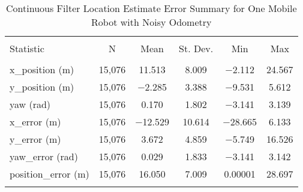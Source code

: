 
\begin{table}[htbp] \centering 
  \caption{Continuous Filter Location Estimate Error Summary for One Mobile Robot with Noisy Odometry} 
  \label{tab:one_mobile_continuous_summary} 
\begin{tabular}{@{\extracolsep{5pt}}lccccc} 
\\[-1.8ex]\hline 
\hline \\[-1.8ex] 
Statistic & \multicolumn{1}{c}{N} & \multicolumn{1}{c}{Mean} & \multicolumn{1}{c}{St. Dev.} & \multicolumn{1}{c}{Min} & \multicolumn{1}{c}{Max} \\ 
\hline \\[-1.8ex] 
x\_position (m) & 15,076 & \num{11.513} & \num{8.009} & $-$2.112 & \num{24.567} \\ 
y\_position (m) & 15,076 & $-$2.285 & \num{3.388} & $-$9.531 & \num{5.612} \\ 
yaw (rad) & 15,076 & \num{0.170} & \num{1.802} & $-$3.141 & \num{3.139} \\ 
x\_error (m) & 15,076 & $-$12.529 & \num{10.614} & $-$28.665 & \num{6.133} \\ 
y\_error (m) & 15,076 & \num{3.672} & \num{4.859} & $-$5.749 & \num{16.526} \\ 
yaw\_error (rad) & 15,076 & \num{0.029} & \num{1.833} & $-$3.141 & \num{3.142} \\ 
position\_error (m) & 15,076 & \num{16.050} & \num{7.009} & \num{0.00001} & \num{28.697} \\ 
\hline \\[-1.8ex] 
\end{tabular} 
\end{table} 
